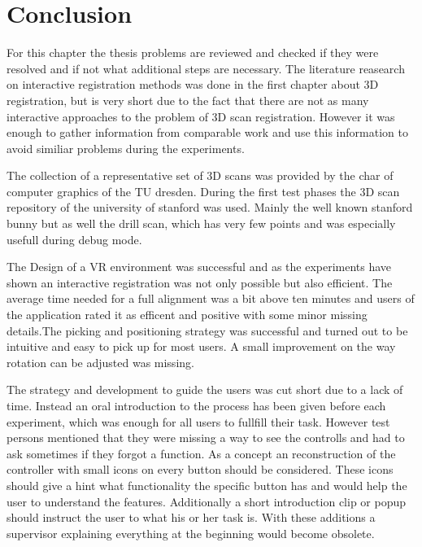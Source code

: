 \documentclass[hyperref,english,bachelorofscience,bibnum,twoside]{cgvpub}
\begin{document}
%

\chapter{Conclusion}

For this chapter the thesis problems are reviewed and checked if they were resolved and if not what additional steps are necessary. 
The literature reasearch on interactive registration methods was done in the first chapter about 3D registration, but is very short due to the fact that there are not as many interactive approaches to the problem of 3D scan registration. However it was enough to gather information from comparable work and use this information to avoid similiar problems during the experiments.

The collection of a representative set of 3D scans was provided by the char of computer graphics of the TU dresden. During the first test phases the 3D scan repository of the university of stanford was used. Mainly the well known stanford bunny but as well the drill scan, which has very few points and was especially usefull during debug mode.

The Design of a VR environment was successful and as the experiments have shown an interactive registration was not only possible but also efficient. The average time needed for a full alignment was a bit above ten minutes and users of the application rated it as efficent and positive with some minor missing details.The picking and positioning strategy was successful and turned out to be intuitive and easy to pick up for most users. A small improvement on the way rotation can be adjusted was missing.

The strategy and development to guide the users was cut short due to a lack of time. Instead an oral introduction to the process has been given before each experiment, which was enough for all users to fullfill their task. However test persons mentioned that they were missing a way to see the controlls and had to ask sometimes if they forgot a function. As a concept an reconstruction of the controller with small icons on every button should be considered. These icons should give a hint what functionality the specific button has and would help the user to understand the features. Additionally a short introduction clip or popup should instruct the user to what his or her task is. With these additions a supervisor explaining everything at the beginning would become obsolete.
\end{document}
